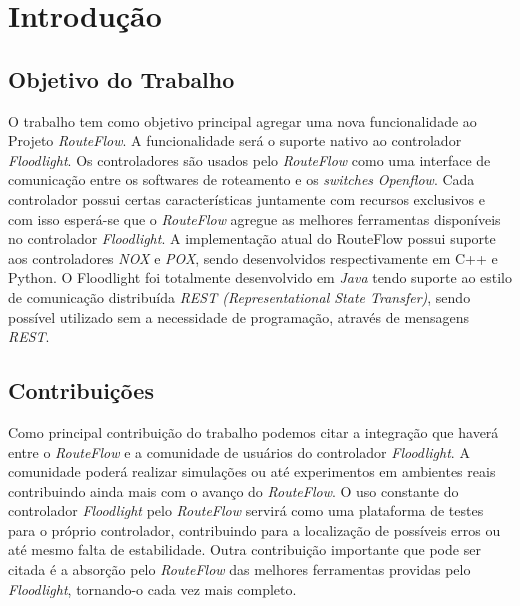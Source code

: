 \chapter{Introdução}

\section{Objetivo do Trabalho}
O trabalho tem como objetivo principal agregar uma
 nova funcionalidade ao Projeto \textit{RouteFlow}. A 
funcionalidade será o suporte nativo ao controlador 
\textit{Floodlight}. Os controladores são usados 
pelo 
\textit{RouteFlow} como uma interface de comunicação
 entre os softwares de roteamento e os \textit{switches} 
\textit{Openflow}. Cada controlador possui certas
 características juntamente com recursos exclusivos e 
com isso esperá-se que o \textit{RouteFlow} agregue
 as melhores ferramentas disponíveis no controlador 
\textit{Floodlight}.
 A implementação atual do RouteFlow possui suporte
 aos controladores \textit{NOX} e \textit{POX}, sendo 
desenvolvidos respectivamente em C++ e Python. O
 Floodlight foi totalmente desenvolvido em \textit{Java} 
tendo suporte ao estilo de comunicação distribuída
 \textit{REST (Representational State Transfer)}, 
sendo possível utilizado sem a necessidade de programação,
  através de mensagens \textit{REST}.

\section{Contribuições}
Como principal contribuição do trabalho podemos citar
 a integração que haverá entre o \textit{RouteFlow} 
e a comunidade de usuários do controlador \textit{Floodlight}. 
A comunidade poderá realizar simulações 
ou até experimentos em ambientes reais contribuindo ainda
 mais com o avanço do \textit{RouteFlow}. O uso
constante do controlador \textit{Floodlight} pelo
 \textit{RouteFlow} servirá como uma plataforma de testes
para o próprio controlador, contribuindo para a localização de
 possíveis erros ou até mesmo falta de estabilidade.
Outra 
contribuição importante que pode ser citada é a absorção pelo
  \textit{RouteFlow} das melhores 
ferramentas providas pelo \textit{Floodlight}, tornando-o
 cada vez mais completo.  
